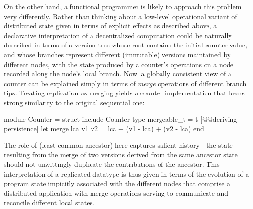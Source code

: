 On the other hand, a functional programmer is likely to approach this
problem very differently.  Rather than thinking about a low-level
operational variant of distributed state given in terms of explicit
effects as described above, a declarative interpretation of a
decentralized computation could be naturally described in terms of a
version tree whose root contains the initial counter value, and whose
branches represent different (immutable) versions maintained by
different nodes, with the state produced by a counter's operations on
a node recorded along the node's local branch.  Now, a globally
consistent view of a counter can be explained simply in terms of
\emph{merge} operations of different branch tips.  Treating
replication as merging yields a counter implementation that bears
strong similarity to the original sequential one:
  \begin{ocaml}
    module Counter = struct
      include Counter
      type mergeable_t = t [@@deriving persistence]
      let merge lca v1 v2 = lca + (v1 - lca) + (v2 - lca)
    end
  \end{ocaml}
The role of  (least common ancestor) here captures salient
history - the state resulting from the merge of two versions derived
from the same ancestor state should not unwittingly duplicate the
contributions of the ancestor.  This interpretation of a replicated
datatype is thus given in terms of the evolution of a program state
impicitly associated with the different nodes that comprise a
distributed application with merge operations serving to communicate
and reconcile different local states.
